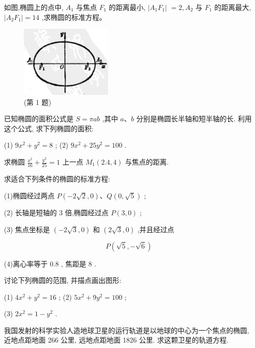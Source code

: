 \documentclass[lang=cn,newtx,10.5pt,scheme=chinese]{elegantbook}
\begin{document}
\begin{problemset}[习 题 六]

\item 如图,椭圆上的点中, \({A}_{1}\) 与焦点 \({F}_{1}\) 的距离最小, \(\left| {{A}_{1}{F}_{1}}\right|\) \(= 2,{A}_{2}\) 与 \({F}_{1}\) 的距离最大, \(\left| {{A}_{2}{F}_{1}}\right| = {14}\) ,求椭圆的标准方程。

\begin{figure}[h]
	\centering
	\includegraphics[max width=0.4\textwidth]{images/01912cc2-ffb6-728e-9ae7-b113ff05c64b_94_706053.jpg}
	\caption{(第 1 题)}
\end{figure}
\item 已知椭圆的面积公式是 \(S = {\pi ab}\) ,其中 \(a\text{、}b\) 分别是椭圆长半轴和短半轴的长. 利用这个公式, 求下列椭圆的面积:

(1) \(9{x}^{2} + {y}^{2} = 8\) ; (2) \(9{x}^{2} + {25}{y}^{2} = {100}\) .

\item 求椭圆 \(\frac{{x}^{2}}{16} + \frac{{y}^{2}}{25} = 1\) 上一点 \({M}_{1}\left( {{2.4},4}\right)\) 与焦点的距离.

\item 求适合下列条件的椭圆的标准方程:

(1)椭圆经过两点 \(P\left( {-2\sqrt{2},0}\right) \text{、}Q\left( {0,\sqrt{5}}\right)\) ;

(2) 长轴是短轴的 3 倍,椭圆经过点 \(P\left( {3,0}\right)\) ;

(3) 焦点坐标是 \(\left( {-2\sqrt{3},0}\right)\) 和 \(\left( {2\sqrt{3},0}\right)\) ,并且经过点

\[
  P\left( {\sqrt{5}, - \sqrt{6}}\right)
\]

(4)离心率等于 0.8 , 焦距是 8 .

\item 讨论下列椭圆的范围, 并描点画出图形:

(1) \(4{x}^{2} + {y}^{2} = {16}\) ; (2) \(5{x}^{2} + 9{y}^{2} = {100}\) ;

(3) \(2{x}^{2} = 1 - {y}^{2}\) .

\item 我国发射的科学实验人造地球卫星的运行轨道是以地球的中心为一个焦点的椭圆, 近地点距地面 266 公里, 远地点距地面 1826 公里. 求这颗卫星的轨道方程.


\end{problemset}
\end{document}
